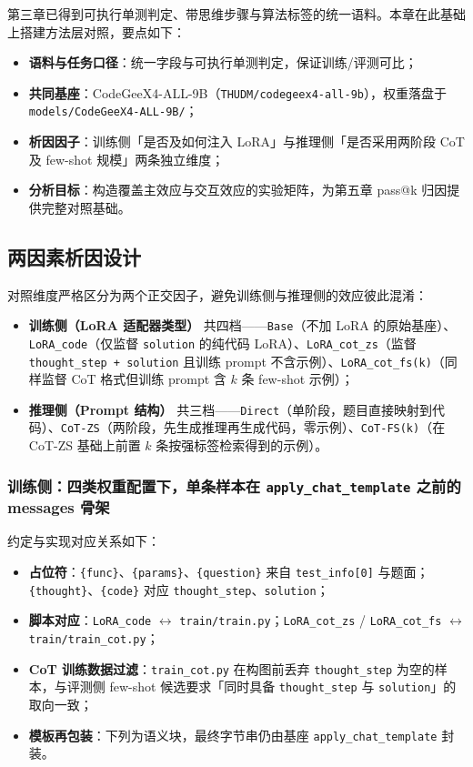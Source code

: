 
第三章已得到可执行单测判定、带思维步骤与算法标签的统一语料。本章在此基础上搭建方法层对照，要点如下：
\begin{itemize}
    \item \textbf{语料与任务口径}：统一字段与可执行单测判定，保证训练/评测可比；
    \item \textbf{共同基座}：CodeGeeX4-ALL-9B（\texttt{THUDM/codegeex4-all-9b}），权重落盘于 \texttt{models/CodeGeeX4-ALL-9B/}；
    \item \textbf{析因因子}：训练侧「是否及如何注入 LoRA」与推理侧「是否采用两阶段 CoT 及 few-shot 规模」两条独立维度；
    \item \textbf{分析目标}：构造覆盖主效应与交互效应的实验矩阵，为第五章 pass@k 归因提供完整对照基础。
\end{itemize}

\subsection{两因素析因设计}
对照维度严格区分为两个正交因子，避免训练侧与推理侧的效应彼此混淆：
\begin{itemize}
    \item \textbf{训练侧（LoRA 适配器类型）} 共四档——\texttt{Base}（不加 LoRA 的原始基座）、\texttt{LoRA\_code}（仅监督 \texttt{solution} 的纯代码 LoRA）、\texttt{LoRA\_cot\_zs}（监督 \texttt{thought\_step + solution} 且训练 prompt 不含示例）、\texttt{LoRA\_cot\_fs(k)}（同样监督 CoT 格式但训练 prompt 含 $k$ 条 few-shot 示例）；
    \item \textbf{推理侧（Prompt 结构）} 共三档——\texttt{Direct}（单阶段，题目直接映射到代码）、\texttt{CoT-ZS}（两阶段，先生成推理再生成代码，零示例）、\texttt{CoT-FS(k)}（在 CoT-ZS 基础上前置 $k$ 条按强标签检索得到的示例）。
\end{itemize}

\subsubsection{训练侧：四类权重配置下，单条样本在 \texttt{apply\_chat\_template} 之前的 messages 骨架}
约定与实现对应关系如下：
\begin{itemize}
    \item \textbf{占位符}：\texttt{\{func\}}、\texttt{\{params\}}、\texttt{\{question\}} 来自 \texttt{test\_info[0]} 与题面；\texttt{\{thought\}}、\texttt{\{code\}} 对应 \texttt{thought\_step}、\texttt{solution}；
    \item \textbf{脚本对应}：\texttt{LoRA\_code} $\leftrightarrow$ \texttt{train/train.py}；\texttt{LoRA\_cot\_zs} / \texttt{LoRA\_cot\_fs} $\leftrightarrow$ \texttt{train/train\_cot.py}；
    \item \textbf{CoT 训练数据过滤}：\texttt{train\_cot.py} 在构图前丢弃 \texttt{thought\_step} 为空的样本，与评测侧 few-shot 候选要求「同时具备 \texttt{thought\_step} 与 \texttt{solution}」的取向一致；
    \item \textbf{模板再包装}：下列为语义块，最终字节串仍由基座 \texttt{apply\_chat\_template} 封装。
\end{itemize}

